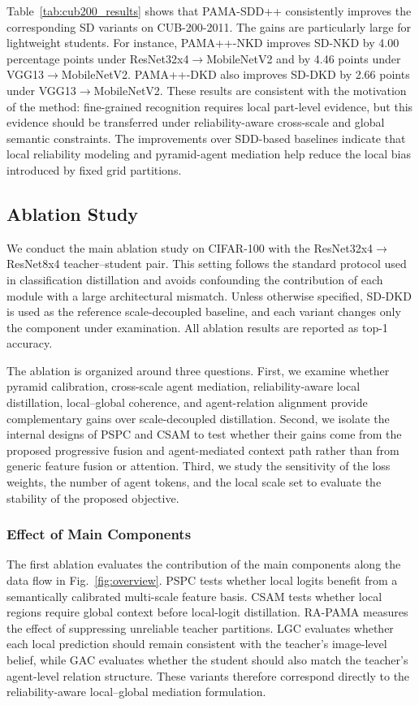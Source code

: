 \documentclass[a4paper,fleqn]{cas-dc}
\begin{document}
Table~\ref{tab:cub200_results} shows that PAMA-SDD++ consistently improves
the corresponding SD variants on CUB-200-2011. The gains are particularly
large for lightweight students. For instance, PAMA++-NKD improves SD-NKD by
4.00 percentage points under ResNet32x4$\rightarrow$MobileNetV2 and by
4.46 points under VGG13$\rightarrow$MobileNetV2. PAMA++-DKD also improves
SD-DKD by 2.66 points under VGG13$\rightarrow$MobileNetV2. These results
are consistent with the motivation of the method: fine-grained recognition
requires local part-level evidence, but this evidence should be transferred
under reliability-aware cross-scale and global semantic constraints. The
improvements over SDD-based baselines indicate that local reliability
modeling and pyramid-agent mediation help reduce the local bias introduced by
fixed grid partitions.

\subsection{Ablation Study}
\label{sec:ablation}

We conduct the main ablation study on CIFAR-100 with the
ResNet32x4$\rightarrow$ResNet8x4 teacher--student pair. This setting follows
the standard protocol used in classification distillation and avoids
confounding the contribution of each module with a large architectural
mismatch. Unless otherwise specified, SD-DKD is used as the reference
scale-decoupled baseline, and each variant changes only the component under
examination. All ablation results are reported as top-1 accuracy.

The ablation is organized around three questions. First, we examine whether
pyramid calibration, cross-scale agent mediation, reliability-aware local
distillation, local--global coherence, and agent-relation alignment provide
complementary gains over scale-decoupled distillation. Second, we isolate the
internal designs of PSPC and CSAM to test whether their gains come from the
proposed progressive fusion and agent-mediated context path rather than from
generic feature fusion or attention. Third, we study the sensitivity of the
loss weights, the number of agent tokens, and the local scale set to evaluate
the stability of the proposed objective.

\subsubsection{Effect of Main Components}

The first ablation evaluates the contribution of the main components along
the data flow in Fig.~\ref{fig:overview}. PSPC tests whether local logits
benefit from a semantically calibrated multi-scale feature basis. CSAM tests
whether local regions require global context before local-logit distillation.
RA-PAMA measures the effect of suppressing unreliable teacher partitions.
LGC evaluates whether each local prediction should remain consistent with the
teacher's image-level belief, while GAC evaluates whether the student should
also match the teacher's agent-level relation structure. These variants
therefore correspond directly to the reliability-aware local--global
mediation formulation.
\end{document}
